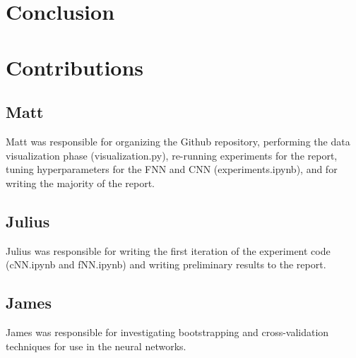 \documentclass[conference]{IEEEtran}
\begin{document}
\section{Conclusion}

\section{Contributions}

\subsection{Matt}

Matt was responsible for organizing the Github repository, performing the data visualization phase (visualization.py), re-running experiments for the report, tuning hyperparameters for the FNN and CNN (experiments.ipynb), and for writing the majority of the report.

\subsection{Julius}

Julius was responsible for writing the first iteration of the experiment code (cNN.ipynb and fNN.ipynb) and writing preliminary results to the report.

\subsection{James}

James was responsible for investigating bootstrapping and cross-validation techniques for use in the neural networks.



\end{document}

